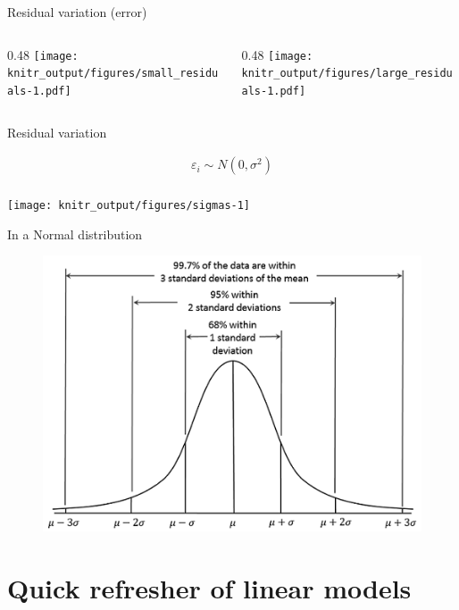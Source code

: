\documentclass[10pt,ignorenonframetext,]{beamer}
\def\begincols{\begin{columns}[c]}
\def\endcols{\end{columns}}
\def\begincol{\begin{column}{0.48\textwidth}}
\def\endcol{\end{column}}
\begin{document}
\begin{frame}{Residual variation (error)}

\begincols
\begincol
\texttt{[image: knitr\_output/figures/small\_residuals-1.pdf]} \endcol

\begincol
\texttt{[image: knitr\_output/figures/large\_residuals-1.pdf]} \endcol
\endcols

\end{frame}

\begin{frame}{Residual variation}

\[
  \begin{aligned}  
  \varepsilon _{i}\sim N\left( 0,\sigma^2 \right) \\  
  \end{aligned}  
\]

\begin{center}\texttt{[image: knitr\_output/figures/sigmas-1]} \end{center}

\end{frame}

\begin{frame}{In a Normal distribution}

\begin{figure}[htbp]
\centering
\includegraphics{images/gaussian.png}
\caption{}
\end{figure}

\end{frame}

\section{Quick refresher of linear
models}\label{quick-refresher-of-linear-models}
\end{document}
